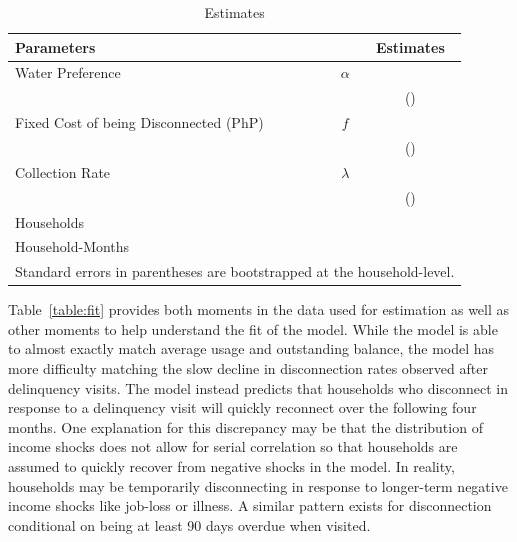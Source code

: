 \documentclass[12pt]{article}
\begin{document}
\begin{table}[h!]
\centering
\caption{Estimates}\label{table:estimates}
\vspace{-2mm}
\begin{tabular}{l*{1}{cc}}
\toprule
Parameters  &   & Estimates \\
\midrule
Water Preference & $\alpha$ &  \\
 &  & (\unskip) \\[.4em]
Fixed Cost of being Disconnected (PhP) & $f$ &   \\
 &  &  (\unskip) \\[.4em]
Collection Rate & $\lambda$ &  \\
 &  & (\unskip) \\[.8em]
Households & &  \\
Household-Months & &  \\
\bottomrule
\multicolumn{3}{l}{\scriptsize Standard errors in parentheses are bootstrapped at the household-level.} %
\end{tabular}
\end{table}

Table~\ref{table:fit} provides both moments in the data used for estimation as well as other moments to help understand the fit of the model.  While the model is able to almost exactly match average usage and outstanding balance, the model has more difficulty matching the slow decline in disconnection rates observed after delinquency visits.  The model instead predicts that households who disconnect in response to a delinquency visit will quickly reconnect over the following four months.  One explanation for this discrepancy may be that the distribution of income shocks does not allow for serial correlation so that households are assumed to quickly recover from negative shocks in the model.  In reality, households may be temporarily disconnecting in response to longer-term negative income shocks like job-loss or illness.  A similar pattern exists for disconnection conditional on being at least 90 days overdue when visited.
\end{document}
